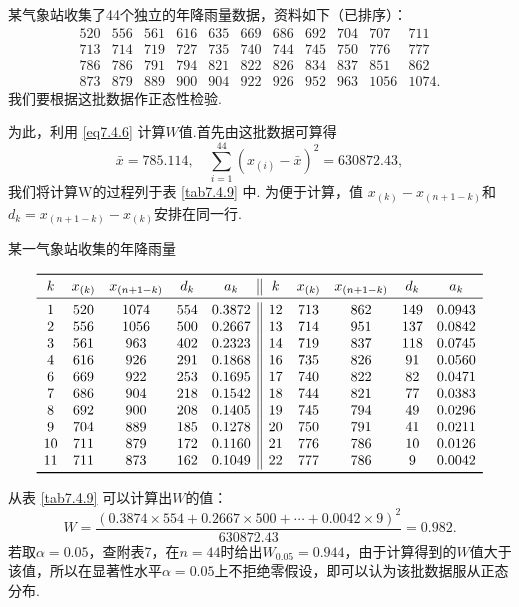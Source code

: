 \begin{example}\label{exam7.4.6}
  某气象站收集了44个独立的年降雨量数据，资料如下（已排序）：
  \[
    \begin{array}{*{11}{c}}
      520 & 556 & 561 & 616 & 635 & 669 & 686 & 692 & 704 & 707 & 711 \\
      713 & 714 & 719 & 727 & 735 & 740 & 744 & 745 & 750 & 776 & 777 \\
      786 & 786 & 791 & 794 & 821 & 822 & 826 & 834 & 837 & 851 & 862 \\
      873 & 879 & 889 & 900 & 904 & 922 & 926 & 952 & 963 & 1056 &1074.
    \end{array}
  \]
  我们要根据这批数据作正态性检验.

  为此，利用 \eqref{eq7.4.6} 计算$W$值.首先由这批数据可算得
  \[
    \bar x = 785.114,\quad \sum_{i=1}^{44}( x_{(i)} - \bar x )^2 = 630872.43,
  \]
  我们将计算W的过程列于表 \ref{tab7.4.9} 中. 为便于计算，值 $x_{(k)}-x_{(n+1-k)}$和$d_k=x_{(n+1-k)}-x_{(k)}$安排在同一行.
  \begin{table}[!ht]
    \centering
    \caption{某一气象站收集的年降雨量}\label{tab7.4.9}
    \[
      \begin{array}{ccccc||ccccc}
        \toprule
        k & x_{(k)} & x_{(n+1-k)} & d_k & a_k & k & x_{(k)} & x_{(n+1-k)} & d_k & a_k \\
        \midrule
        1 & 520 & 1074 & 554 & 0.3872 & 12 & 713 & 862 & 149 & 0.0943 \\
        2 & 556 & 1056 & 500 & 0.2667 & 13 & 714 & 951 & 137 & 0.0842 \\
        3 & 561 & 963 & 402 & 0.2323 & 14 & 719 & 837 & 118 & 0.0745 \\
        4 & 616 & 926 & 291 & 0.1868 & 16 & 735 & 826 & 91 & 0.0560 \\
        6 & 669 & 922 & 253 & 0.1695 & 17 & 740 & 822 & 82 & 0.0471 \\
        7 & 686 & 904 & 218 & 0.1542 & 18 & 744 & 821 & 77 & 0.0383 \\
        8 & 692 & 900 & 208 & 0.1405 & 19 & 745 & 794 & 49 & 0.0296 \\
        9 & 704 & 889 & 185 & 0.1278 & 20 & 750 & 791 & 41 & 0.0211 \\
        10 & 711 & 879 & 172 & 0.1160 & 21 & 776 & 786 & 10 & 0.0126 \\
        11 & 711 & 873 & 162 & 0.1049 & 22 & 777 & 786 & 9 & 0.0042 \\
        \bottomrule
      \end{array}
    \]
  \end{table}
  从表 \ref{tab7.4.9} 可以计算出$W$的值：
  \[
    W = \frac{(0.3874\times 554 + 0.2667\times500 + \cdots + 0.0042\times 9 )^2}{630872.43} = 0.982.
  \]
  若取$\alpha=0.05$，查附表7，在$n=44$时给出$W_{0.05}=0.944$，由于计算得到的$W$值大于该值，所以在显著性水平$\alpha=0.05$上不拒绝零假设，即可以认为该批数据服从正态分布.
\end{example}



